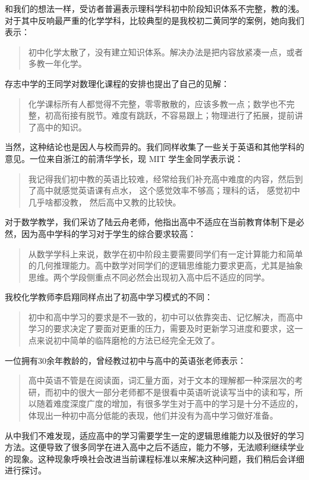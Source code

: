 \documentclass[12pt,UTF8]{ctexart}
\begin{document}
\par{和我们的想法一样，受访者普遍表示理科学科初中阶段知识体系不完整，教的浅。对于其中反响最严重的化学学科，比较典型的是我校初二黄同学的案例，她向我们表示：
	\begin{quote}
		\kaishu 初中化学太散了，没有建立知识体系。解决办法是把内容放紧凑一点，或者多教一年化学。
	\end{quote}
	存志中学的王同学对数理化课程的安排也提出了自己的见解：
	\begin{quote}
		\kaishu
		化学课标所有人都觉得不完整，零零散散的，应该多教一点；数学也不完整，初高衔接有脱节。难度有跳跃，不容易跟上；物理进行了拓展，提前讲了高中的知识。
	\end{quote}
	当然，这种结论也是因人与校而异的。我们同样收集了一些关于英语和其他学科的意见。一位来自浙江的前清华学长，现 MIT 学生金同学表示说：
	\begin{quote}
		\kaishu 我记得我们初中教的英语比较难，经常给我们补充高中难度的内容，然后到了高中就感觉英语课有点水， 这个感觉效率不够高；理科的话，
		感觉初中几乎啥都没教， 然后高中又教的比较快。
	\end{quote}
	对于数学教学，我们采访了陆云舟老师，他指出高中不适应在当前教育体制下是必然，因为高中学科的学习对于学生的综合要求较高：
	\begin{quote}
		\kaishu
		从数学学科上来说，数学在初中阶段主要需要同学们有一定计算能力和简单的几何推理能力。高中数学对同学们的逻辑思维能力要求更高，尤其是抽象思维。两个学段侧重点不同必然会出现初入高中后不适应的同学。
	\end{quote}
	我校化学教师李启翔同样点出了初高中学习模式的不同：
	\begin{quote}
		\kaishu
		初中和高中学习的要求是不一致的，初中可以依靠突击、记忆解决，而高中学习的要求决定了要面对更重的压力，需要及时更新学习进度和要求，这一点来说初中简单的临阵磨枪的方法已经完全无效了。
	\end{quote}
	一位拥有30余年教龄的，曾经教过初中与高中的英语张老师表示：
	\begin{quote}
		\kaishu
		高中英语不管是在阅读面，词汇量方面，对于文本的理解都一种深层次的考研，而初中的很大一部分老师都不是很看中英语听说读写当中的读和写，所以随着难度深度广度的增加，有很多学生对于高中的学习是十分不适应的，体现出一种初中高分低能的表现，他们并没有为高中学习做好准备。
	\end{quote}
	
	从中我们不难发现，适应高中的学习需要学生一定的逻辑思维能力以及很好的学习方法。这便导致了很多同学在进入高中之后不适应，能力不够，无法顺利继续学业的现象。这种现象呼唤社会改进当前课程标准以来解决这种问题，我们稍后会详细进行探讨。
}
\end{document}
